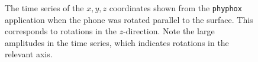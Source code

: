 \documentclass[a4paper]{article}
\begin{document}
\begin{figure}[hbt!]
	\centering
	\quad

	\caption{The time series of the $x, y, z$ coordinates shown from the \texttt{phyphox} application when 
            the phone was rotated parallel to the surface. This corresponds to rotations in the $z$-direction. Note the large amplitudes in 
            the time series, which indicates rotations in the relevant axis. }
	\label{fig:gyro_plot_z}
\end{figure}
\end{document}
